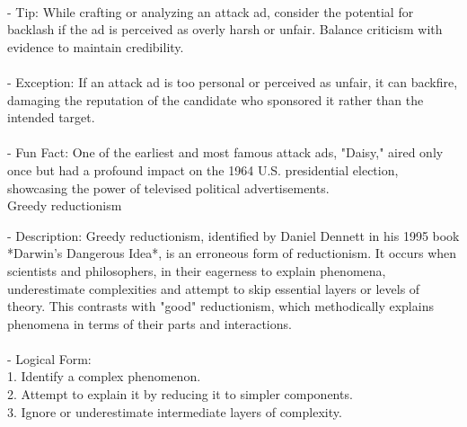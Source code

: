 \documentclass[a4paper,12pt,single,pdftex]{scrbook}
\begin{document}
    
      
    \\

    
      - Tip: While crafting or analyzing an attack ad, consider the potential for backlash if the ad is perceived as overly harsh or unfair. Balance criticism with evidence to maintain credibility.
    \\

    
      
    \\

    
      - Exception: If an attack ad is too personal or perceived as unfair, it can backfire, damaging the reputation of the candidate who sponsored it rather than the intended target.
    \\

    
      
    \\

    
      - Fun Fact: One of the earliest and most famous attack ads, "Daisy," aired only once but had a profound impact on the 1964 U.S. presidential election, showcasing the power of televised political advertisements.
    \\

  

Greedy reductionism
    
      - Description: Greedy reductionism, identified by Daniel Dennett in his 1995 book *Darwin's Dangerous Idea*, is an erroneous form of reductionism. It occurs when scientists and philosophers, in their eagerness to explain phenomena, underestimate complexities and attempt to skip essential layers or levels of theory. This contrasts with "good" reductionism, which methodically explains phenomena in terms of their parts and interactions.
    \\

    
      
    \\

    
      - Logical Form:
    \\

    
        1. Identify a complex phenomenon.
    \\

    
        2. Attempt to explain it by reducing it to simpler components.
    \\

    
        3. Ignore or underestimate intermediate layers of complexity.
    \\
\end{document}
